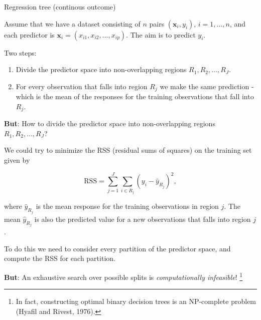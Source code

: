 \documentclass[10pt,ignorenonframetext,]{beamer}
\begin{document}
\begin{frame}{Regression tree (continous outcome)}
\protect\hypertarget{regression-tree-continous-outcome}{}

Assume that we have a dataset consisting of \(n\) pairs
\((\boldsymbol{x}_i,y_i)\), \(i=1,\ldots,n\), and each predictor is
\({\boldsymbol{x}}_i=(x_{i1},x_{i2},...,x_{ip})\). The aim is to predict
\(y_i\).

\vspace{2mm}

Two steps:

\begin{enumerate}
\item
  Divide the predictor space into non-overlapping regions
  \(R_1,R_2,\ldots,R_J\).
\item
  For every observation that falls into region \(R_j\) we make the same
  prediction - which is the mean of the responses for the training
  observations that fall into \(R_j\).
\end{enumerate}

\vspace{2mm}

\textbf{But}: How to divide the predictor space into non-overlapping
regions \(R_1,R_2,\ldots,R_J\)?

\end{frame}

\begin{frame}

We could try to minimize the RSS (residual sums of squares) on the
training set given by

\[
\text{RSS}=\sum_{j=1}^J \sum_{i \in R_j}(y_i-\hat{y}_{R_j})^2,
\]

where \(\hat{y}_{R_j}\) is the mean response for the training
observations in region \(j\). The mean \(\hat{y}_{R_j}\) is also the
predicted value for a new observations that falls into region \(j\).

To do this we need to consider every partition of the predictor space,
and compute the RSS for each partition.

\textbf{But}: An exhaustive search over possible splits is
\emph{computationally infeasible}!
\footnote{In fact, constructing optimal binary decision trees is an NP-complete problem (Hyafil and Rivest, 1976).}

\end{frame}
\end{document}
